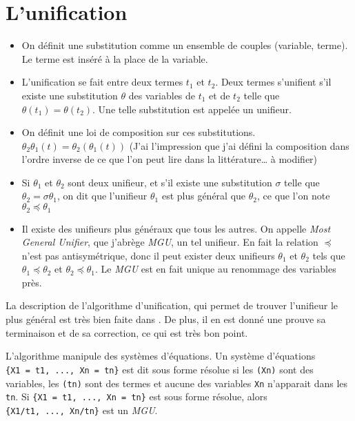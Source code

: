 \documentclass{article}
\begin{document}
\section{L'unification}

\begin{itemize}
  \item
    On définit une substitution comme un ensemble de couples (variable, terme). Le terme est inséré à la place de la variable.
  \item
    L'unification se fait entre deux termes \(t_1\) et \(t_2\). Deux termes s'unifient s'il existe une substitution \(\theta\) des variables de \(t_1\) et de \(t_2\) telle que \(\theta(t_1) = \theta(t_2)\). Une telle substitution est appelée un unifieur.
  \item
    On définit une loi de composition sur ces substitutions. \(\theta_2\theta_1(t) = \theta_2(\theta_1(t))\) (J'ai l'impression que j'ai défini la composition dans l'ordre inverse de ce que l'on peut lire dans la littérature\ldots{} à modifier)
  \item
    Si \(\theta_1\) et \(\theta_2\) sont deux unifieur, et s'il existe une substitution \(\sigma\) telle que \(\theta_2 = \sigma\theta_1\), on dit que l'unifieur \(\theta_1\) est plus général que \(\theta_2\), ce que l'on note \(\theta_2\preceq\theta_1\)
  \item
    Il existe des unifieurs plus généraux que tous les autres. On appelle \emph{Most General Unifier}, que j'abrège \emph{MGU}, un tel unifieur. En fait la relation \(\preceq\) n'est pas antisymétrique, donc il peut exister deux unifieurs \(\theta_1\) et \(\theta_2\) tels que \(\theta_1\preceq\theta_2\) et \(\theta_2\preceq\theta_1\). Le \emph{MGU} est en fait unique au renommage des variables près.
\end{itemize}

La description de l'algorithme d'unification, qui permet de trouver l'unifieur le plus général est très bien faite dans \cite{NilssonMaluszynski}. De plus, il en est donné une prouve sa terminaison et de sa correction, ce qui est très bon point.

L'algorithme manipule des systèmes d'équations. Un système d'équations \texttt{\{X1\ =\ t1,\ ...,\ Xn\ =\ tn\}} est dit sous forme résolue si les \texttt{(Xn)} sont des variables, les \texttt{(tn)} sont des termes et aucune des variables \texttt{Xn} n'apparait dans les \texttt{tn}. Si \texttt{\{X1\ =\ t1,\ ...,\ Xn\ =\ tn\}} est sous forme résolue, alors \texttt{\{X1/t1,\ ...,\ Xn/tn\}} est un \emph{MGU}.
\end{document}
